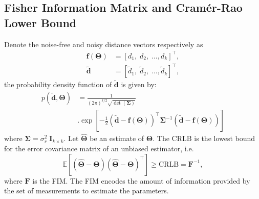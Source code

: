 \documentclass[journal]{IEEEtran}
\def\CovMatR{\mathbf{\Sigma}}
\def\StateVector{\mathbf{\Theta}}
\def\FIM{\mathbf{F}}
\begin{document}
\subsection{Fisher Information Matrix and Cramér-Rao Lower Bound} \label{subsec:CRLB_derivation}

Denote the noise-free and noisy distance vectors respectively as
\begin{equation}
\begin{aligned}
    \mathbf{f}(\StateVector) &= [d_1, \; d_2, \; \dots, d_k]^\top,\\
    \tilde{\mathbf{d}} &= [\tilde{d}_1, \; \tilde{d}_2, \; \dots, \tilde{d}_k]^\top,
\end{aligned}
\end{equation}
the probability density function of $\tilde{\mathbf{d}}$ is given by:
\begin{equation}
\begin{aligned}
    p(\tilde{\mathbf{d}}, \StateVector) &= \frac{1}{(2\pi)^{k/2} \sqrt{\operatorname{det}(\CovMatR)}}\\
    &. \operatorname{exp} \left[ - \frac{1}{2} (\tilde{\mathbf{d}} - \mathbf{f}(\StateVector))^\top \CovMatR^{-1} (\tilde{\mathbf{d}} - \mathbf{f}(\StateVector)) \right]
\end{aligned}
\end{equation}
where $\CovMatR = \sigma_r^2 \; \mathbf{I}_{k \times k}$.
Let $\hat{\StateVector}$ be an estimate of ${\StateVector}$. The CRLB is the lowest bound for the error covariance matrix of an unbiased estimator, i.e.
\begin{equation} \label{eq:CRLB_definition}
    \mathbb{E}\left[ 
    (\hat{\StateVector} - \StateVector) (\hat{\StateVector} - \StateVector)^\top
    \right] \geq \textrm{CRLB} = \FIM^{-1},
\end{equation}
where $\FIM$ is the FIM. The FIM encodes the amount of information provided by the set of measurements to estimate the parameters. 
\end{document}
